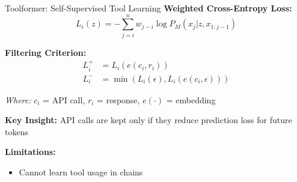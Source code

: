\documentclass[aspectratio=169]{beamer}
\begin{document}
\begin{frame}{Toolformer: Self-Supervised Tool Learning}
	\textbf{Weighted Cross-Entropy Loss:}
	$$L_i(z) = -\sum_{j=i}^{n} w_{j-i} \log P_M(x_j | z, x_{1:j-1})$$
	
	\textbf{Filtering Criterion:}
	\begin{align}
		L_i^+ &= L_i(e(c_i, r_i)) \\
		L_i^- &= \min(L_i(\epsilon), L_i(e(c_i, \epsilon)))
	\end{align}
	
	\textit{Where:} $c_i$ = API call, $r_i$ = response, $e(\cdot)$ = embedding
		
	\textbf{Key Insight:}
		API calls are kept only if they {\color{highlight}reduce prediction loss} for future tokens

		\textbf{Limitations:}
	\begin{itemize}
		\item Cannot learn tool usage in chains
	\end{itemize}

	\vspace{0.2cm}
\end{frame}


		
		
				
\end{document}
